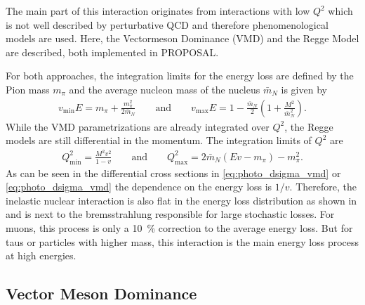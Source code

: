 The main part of this interaction originates from interactions with low $Q^2$ which is not well described by perturbative QCD and therefore phenomenological models are used.
Here, the Vectormeson Dominance (VMD) and the Regge Model are described, both implemented in PROPOSAL.

For both approaches, the integration limits for the energy loss are defined by the Pion mass $m_\pi$ and the average nucleon mass of the nucleus $\bar{m}_N$ is given by
\begin{align}
    v_{\mathrm{min}} E = m_\pi + \frac{m_\pi^2}{2 \bar{m}_N}
    \qquad
    \text{and}
    \qquad
    v_{\mathrm{max}} E = 1 - \frac{\bar{m}_N}{2} \left( 1 + \frac{M^2}{\bar{m}_N^2} \right) .
\end{align}
While the VMD parametrizations are already integrated over $Q^2$, the Regge models are still differential in the momentum.
The integration limits of $Q^2$ are
\begin{align}
    Q_{\text{min}}^2 = \frac{M^2 v^2}{1 - v}
    \qquad \text{and} \qquad
    Q_{\text{max}}^2 = 2 \bar{m}_N (E v - m_\pi) - m_\pi^2 .
\end{align}
As can be seen in the differential cross sections in \eqref{eq:photo_dsigma_vmd} or \eqref{eq:photo_dsigma_vmd} the dependence on the energy loss is $1/v$.
Therefore, the inelastic nuclear interaction is also flat in the energy loss distribution as shown in  and is next to the bremsstrahlung responsible for large stochastic losses.
For muons, this process is only a \SI{10}{\%} correction to the average energy loss.
But for taus or particles with higher mass, this interaction is the main energy loss process at high energies.

\subsection{Vector Meson Dominance} \label{sec:photo_vmd}

